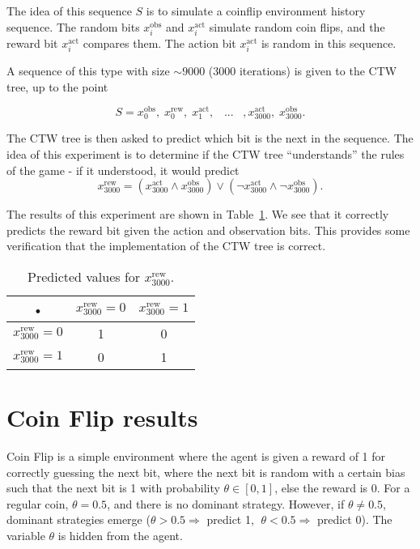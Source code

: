 \documentclass[pdftex,twoside,a4paper]{report}
\newcommand{\bcen}{\begin{center}}
\newcommand{\ecen}{\end{center}}
\begin{document}
The idea of this sequence $S$ is to simulate a coinflip environment history sequence. The random bits $x^{\text{obs}}_i$ and $x^{\text{act}}_i$ simulate random coin flips, and the reward bit $x^{\text{act}}_i$ compares them. The action bit $x^{\text{act}}_i$ is random in this sequence.

A sequence of this type with size  $\sim 9000$ (3000 iterations) is given to the CTW tree, up to the point

\[
S = x^{\text{obs}}_0,\; x^{\text{rew}}_0,\; x^{\text{act}}_1,\;\;\;...\;\;\;,x^{\text{act}}_{3000},\;x^{\text{obs}}_{3000}.
\]

The CTW tree is then asked to predict which bit is the next in the sequence. The idea of this experiment is to determine if the CTW tree ``understands'' the rules of the game - if it understood, it would predict \[x^{\text{rew}}_{3000} = (x^{\text{act}}_{3000} \land x^{\text{obs}}_{3000}) \lor (\lnot x^{\text{act}}_{3000} \land \lnot x^{\text{obs}}_{3000}).\]

The results of this experiment are shown in Table~\ref{tab:non_det_seq_pred}. We see that it correctly predicts the reward bit given the action and observation bits. This provides some verification that the implementation of the CTW tree is correct.

\begin{table}
\bcen
\bgroup
\def\arraystretch{1.5}
\begin{tabular}{c |c| c }
 • & $x^{\text{rew}}_{3000} = 0$ & $x^{\text{rew}}_{3000} = 1$ \\ 
\hline $x^{\text{rew}}_{3000} = 0$ & 1 & 0 \\ 
\hline $x^{\text{rew}}_{3000} = 1$ & 0 & 1 \\  
\end{tabular}
\egroup
\ecen
\caption{Predicted values for $x^{\text{rew}}_{3000}$.}
\label{tab:non_det_seq_pred}
\end{table}

\section{Coin Flip results}

 Coin Flip is a simple environment where the agent is given a reward of 1 for correctly guessing the next bit, where the next bit is random with a certain bias such that the next bit is 1 with probability $\theta \in [0,1]$, else the reward is 0. For a regular coin, $\theta = 0.5$, and there is no dominant strategy. However, if $\theta \not = 0.5$, dominant strategies emerge ($\theta > 0.5 \Rightarrow $ predict 1, $\; \theta < 0.5 \Rightarrow $ predict 0). The variable $\theta$ is hidden from the agent.
 
\end{document}
